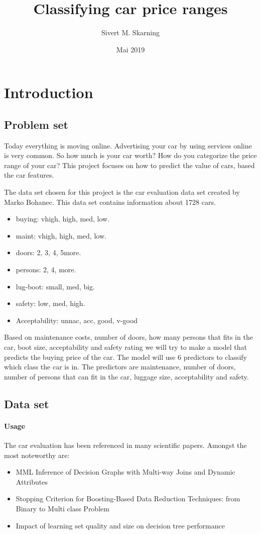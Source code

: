\documentclass[a4paper, 12pt]{article}
\title{Classifying car price ranges}
\author{Sivert M. Skarning}
\date{Mai 2019}
\begin{document}
\maketitle
\clearpage

\section{Introduction}
\subsection{Problem set}
Today everything is moving online. Advertising your car by using services online is very common. So how much is your car worth? How do you categorize the price range of your car? This project focuses on how to predict the value of cars, based the car features.

The data set chosen for this project is the car evaluation data set created by Marko Bohanec. This data set contains information about 1728 cars.

\begin{itemize}
  \item buying: vhigh, high, med, low.
  \item maint: vhigh, high, med, low.
  \item doors: 2, 3, 4, 5more.
  \item persons: 2, 4, more.
  \item lug-boot: small, med, big.
  \item safety: low, med, high.
  \item Acceptability: unnac, acc, good, v-good
\end{itemize}

Based on maintenance costs, number of doors, how many persons that fits in the car, boot size, acceptability and safety rating we will try to make a model that predicts the buying price of the car. The model will use 6 predictors to classify which class the car is in. The predictors are maintenance, number of doors, number of persons that can fit in the car, luggage size, acceptability and safety.


\subsection{Data set}
\paragraph{Usage}
The car evaluation has been referenced in many scientific papers. Amongst the most noteworthy are:
\begin{itemize}
\item MML Inference of Decision Graphs with Multi-way Joins and Dynamic Attributes \cite{mml-interference}
\item Stopping Criterion for Boosting-Based Data Reduction Techniques: from Binary to Multi class Problem \cite{boosting}
\item Impact of learning set quality and size on decision tree performance \cite{learning-set}
\end{itemize}
\end{document}
